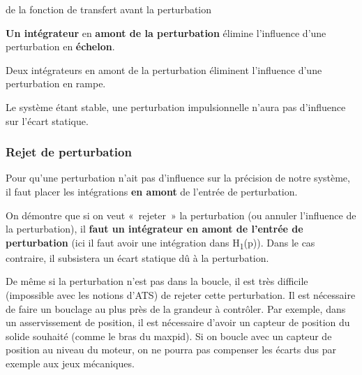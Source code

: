 \begin{longtable}[]
{de la fonction de transfert avant la perturbation} \\
\end{longtable}

\textbf{Un intégrateur} en \textbf{amont de la perturbation} élimine l'influence d'une perturbation en \textbf{échelon}.

Deux intégrateurs en amont de la perturbation éliminent l'influence d'une perturbation en rampe.

Le système étant stable, une perturbation impulsionnelle n'aura pas d'influence sur l'écart statique.

\hypertarget{rejet-de-perturbation}{%
\subsubsection{Rejet de perturbation}\label{rejet-de-perturbation}}

Pour qu'une perturbation n'ait pas d'influence sur la précision de notre système, il faut placer les intégrations \textbf{en amont} de l'entrée de perturbation.

On démontre que si on veut «~rejeter~» la perturbation (ou annuler l'influence de la perturbation), il \textbf{faut un intégrateur en amont de l'entrée de perturbation} (ici il faut avoir une intégration dans H\textsubscript{1}(p)). Dans le cas contraire, il subsistera un écart statique dû à la perturbation.

De même si la perturbation n'est pas dans la boucle, il est très difficile (impossible avec les notions d'ATS) de rejeter cette perturbation. Il est nécessaire de faire un bouclage au plus près de la grandeur à contrôler. Par exemple, dans un asservissement de position, il est nécessaire d'avoir un capteur de position du solide souhaité (comme le bras du maxpid). Si on boucle avec un capteur de position au niveau du moteur, on ne pourra pas compenser les écarts dus par exemple aux jeux mécaniques.

